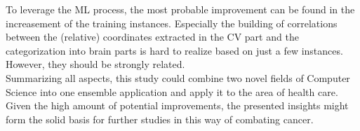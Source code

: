 \documentclass[twoside,11pt]{article}
\begin{document}
	To leverage the ML process, the most probable improvement can be found in the increasement of the training instances. Especially the building of correlations between the (relative) coordinates extracted in the CV part and the categorization into brain parts is hard to realize based on just a few instances. However, they should be strongly related.
	\\
	Summarizing all aspects, this study could combine two novel fields of Computer Science into one ensemble application and apply it to the area of health care. Given the high amount of potential improvements, the presented insights might form the solid basis for further studies in this way of combating cancer.
	

\end{document}
